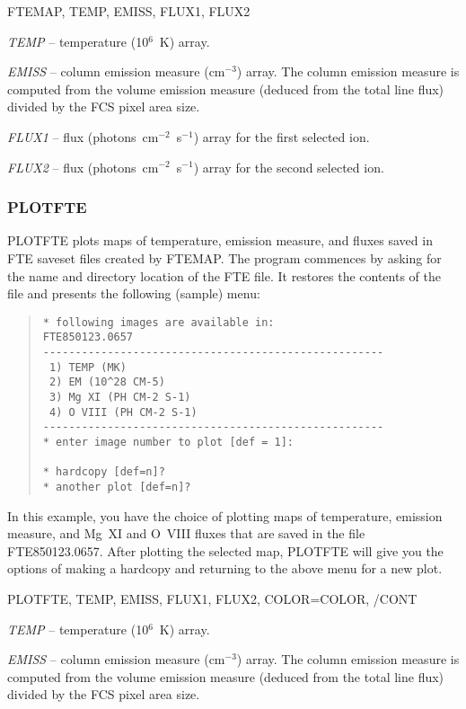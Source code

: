 {{{

FTEMAP, TEMP, EMISS, FLUX1, FLUX2


{\it TEMP} -- temperature (10$^6$~K) array.

{\it EMISS} -- column emission measure (cm$^{-3}$) array. The column emission
measure is computed from the volume emission measure (deduced from the total
line flux) divided by the FCS pixel area size.

{\it FLUX1} -- flux (photons~cm$^{-2}$~s$^{-1}$) array for the first selected
ion.

{\it FLUX2} -- flux (photons~cm$^{-2}$~s$^{-1}$) array for the second selected
ion.

\subsubsection{PLOTFTE}

PLOTFTE plots maps of temperature, emission measure, and fluxes saved in FTE
saveset files created by FTEMAP. The program commences by asking for the name
and directory location of the FTE file. It restores the contents of the file
and presents the following (sample) menu:
\begin{quote}
\begin{verbatim}
* following images are available in:
FTE850123.0657
-----------------------------------------------------
 1) TEMP (MK)
 2) EM (10^28 CM-5)
 3) Mg XI (PH CM-2 S-1)
 4) O VIII (PH CM-2 S-1)
-----------------------------------------------------
* enter image number to plot [def = 1]:

* hardcopy [def=n]?
* another plot [def=n]?
\end{verbatim}
\end{quote}
In this example, you have the choice of plotting maps of
temperature, emission measure,  and Mg~XI and O~VIII fluxes that are saved in
the file FTE850123.0657. After plotting the selected map, PLOTFTE
will give you the options of making a hardcopy and returning to the
above menu for a new plot.


PLOTFTE, TEMP, EMISS, FLUX1, FLUX2, COLOR=COLOR, /CONT


{\it TEMP} -- temperature (10$^6$~K) array.

{\it EMISS} -- column emission measure (cm$^{-3}$) array. The column emission
measure is computed from the volume emission measure (deduced from the total
line flux) divided by the FCS pixel area size.

}}}
